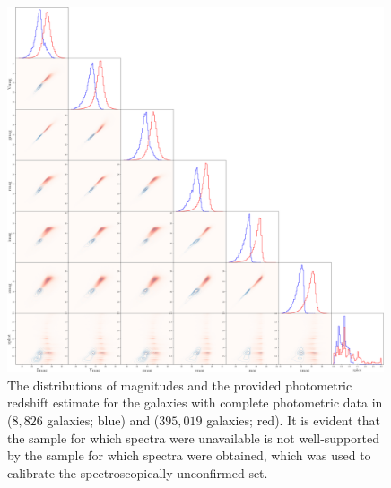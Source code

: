 \begin{figure}
	\begin{center}
		\includegraphics[width=0.99\textwidth]{figures/intro/big_corner_coarse.png}
		\caption{
			The distributions of magnitudes and the provided photometric redshift estimate for the galaxies with complete photometric data in  ($8,826$ galaxies; blue) and  ($395,019$ galaxies; red).
			It is evident that the sample for which spectra were unavailable is not well-supported by the sample for which spectra were obtained, which was used to calibrate the spectroscopically unconfirmed set.
		}
	\end{center}
\end{figure}



